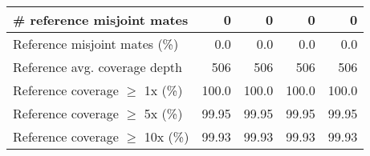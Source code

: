 \documentclass[12pt,a4paper]{article}
\begin{document}
\begin{table}[ht]
\begin{center}
\begin{tabular}{|l*{4}{|r}|}
\# reference misjoint mates & 0 & 0 & 0 & 0 \\ \hline
Reference misjoint mates (\%) & 0.0 & 0.0 & 0.0 & 0.0 \\ \hline
Reference avg. coverage depth & 506 & 506 & 506 & 506 \\ \hline
Reference coverage $\geq$ 1x (\%) & 100.0 & 100.0 & 100.0 & 100.0 \\ \hline
Reference coverage $\geq$ 5x (\%) & 99.95 & 99.95 & 99.95 & 99.95 \\ \hline
Reference coverage $\geq$ 10x (\%) & 99.93 & 99.93 & 99.93 & 99.93 \\ \hline
\end{tabular}
\end{center}
\end{table}
\end{document}
